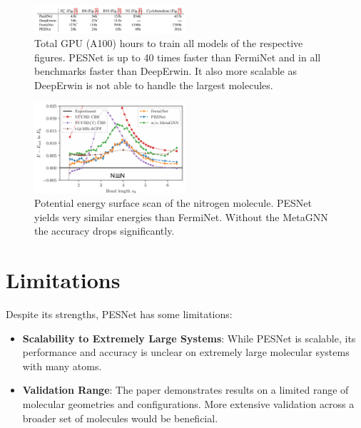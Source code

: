 \documentclass{article}
\begin{document}
\begin{figure}[h]
    \centering
    \includegraphics[width=0.5\textwidth]{table_gpu_times.png}
    \caption{Total GPU (A100) hours to train all models of the respective figures. PESNet is up to 40 times faster than FermiNet and in all benchmarks faster than DeepErwin. It also more scalable as DeepErwin is not able to handle the largest molecules.}
    \label{fig:gpu_times}
\end{figure}

\begin{figure}[h]
    \centering
    \includegraphics[width=0.5\textwidth]{FermiNet_PesNet_comparison}
    \caption{Potential energy surface scan of the
        nitrogen molecule. PESNet yields very similar energies than FermiNet. Without the MetaGNN the accuracy drops significantly.}
    \label{fig:comparison}
\end{figure}

\section{Limitations}
Despite its strengths, PESNet has some limitations:
\begin{itemize}
    \item \textbf{Scalability to Extremely Large Systems}: While PESNet is scalable, its performance and accuracy is unclear on extremely large molecular systems with many atoms.
    \item \textbf{Validation Range}: The paper demonstrates results on a limited range of molecular geometries and configurations. More extensive validation across a broader set of molecules would be beneficial.
\end{itemize}
\end{document}
